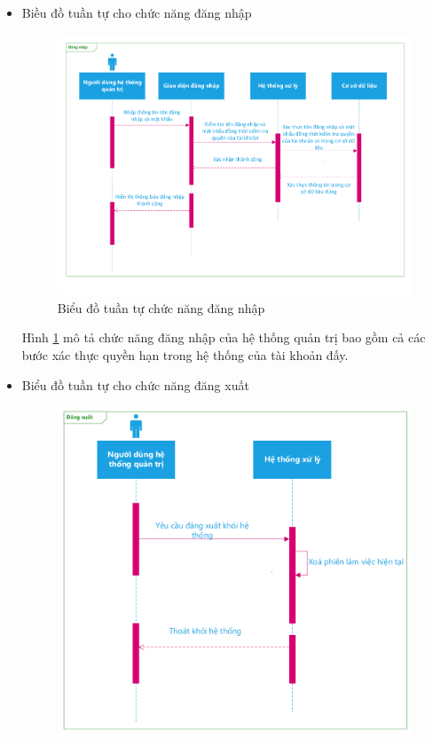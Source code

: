 \begin{itemize}
\item Biều đồ tuần tự cho chức năng đăng nhập
\begin{center}   
    \begin{figure}[h]
     \begin{center} \includegraphics[scale=0.65]{image/SquenceDiagramDN.pdf} 
    \end{center}
     \caption{Biểu đồ tuần tự chức năng đăng nhập} \label{refhinh3_6} 
    \end{figure}
\end{center}
\par
Hình \ref{refhinh3_6} mô tả chức năng đăng nhập của hệ thống quản trị bao gồm cả các bước xác thực quyền hạn trong hệ thống của tài khoản đấy.
\newpage
\item Biểu đồ tuần tự cho chức năng đăng xuất
\begin{center}
    \begin{figure}[h]
    \begin{center}
     \includegraphics[scale=0.7]{image/SquenceDiagramDX.pdf}

\end{center}
\end{figure}
\end{center}
\end{itemize}
